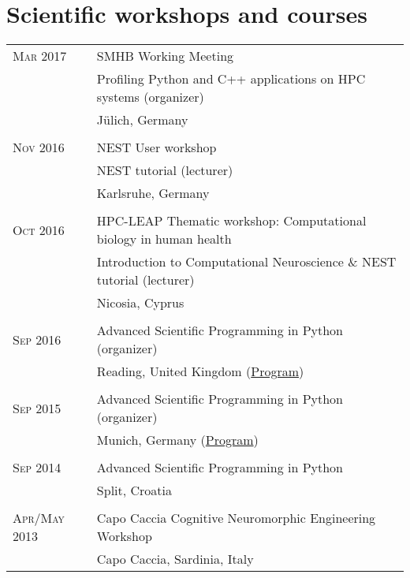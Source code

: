 \documentclass[a4paper,10pt]{article}
\begin{document}
\section{Scientific workshops and courses}
\begin{longtable}{>{\hfill}p{3.15cm}|p{10.4cm}}
  \textsc{Mar} 2017 & SMHB Working Meeting \\
                    & \footnotesize Profiling Python and C++ applications on HPC systems (organizer) \\
                    & \footnotesize J\"ulich, Germany \\
  \multicolumn{2}{c}{} \\
  \textsc{Nov} 2016 & NEST User workshop \\
                    & \footnotesize NEST tutorial (lecturer) \\
                    & \footnotesize Karlsruhe, Germany \\
  \multicolumn{2}{c}{} \\
  \textsc{Oct} 2016 & HPC-LEAP Thematic workshop: Computational biology in human health \\
                    & \footnotesize Introduction to Computational Neuroscience \& NEST tutorial (lecturer) \\
                    & \footnotesize Nicosia, Cyprus \\
  \multicolumn{2}{c}{} \\
  \textsc{Sep} 2016 & Advanced Scientific Programming in Python (organizer)\\
                    &  \footnotesize Reading, United Kingdom (\href{https://python.g-node.org/python-summerschool-2016/schedule.html}{Program}) \\
  \multicolumn{2}{c}{} \\
  \textsc{Sep} 2015 & Advanced Scientific Programming in Python (organizer)\\
  &  \footnotesize Munich, Germany (\href{https://python.g-node.org/python-summerschool-2015/schedule.html}{Program})\\
  \multicolumn{2}{c}{} \\
  \textsc{Sep} 2014 & Advanced Scientific Programming in Python \\
  &  \footnotesize Split, Croatia \\
  \multicolumn{2}{c}{} \\
  \textsc{Apr}/\textsc{May} 2013 & Capo Caccia Cognitive Neuromorphic Engineering Workshop \\
  & \footnotesize Capo Caccia, Sardinia, Italy
\end{longtable}
\end{document}
